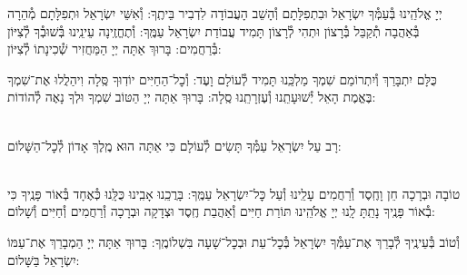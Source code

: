 \documentclass[twoside, openany, parskip=half, 11pt]{book}
\begin{document}
יְיָ אֱלֹהֵֽינוּ בְּ֯עַמְּ֯ךָ יִשְׂרָאֵל וּבִתְפִלָּתָם וְ֯הָשֵׁב הָעֲבוֹדָה לִדְבִיר בֵּיתֶֽךָ: וְ֯אִשֵּׁי יִשְׂרָאֵל וּתְפִלָּתָם מְ֯הֵרָה בְּ֯אַהֲבָה תְ֯קַבֵּל בְּ֯רָצוֹן וּתְהִי לְ֯רָצוֹן תָּמִיד עֲבוֹדַת יִשְׂרָאֵל עַמֶּֽךָ: וְ֯תֶחֱזֶֽינָה עֵינֵֽינוּ בְּ֯שׁוּבְ֯ךָ לְ֯צִיּוֹן בְּ֯רַחֲמִים: בָּרוּךְ אַתָּה יְיָ הַמַּחֲזִיר שְׁ֯כִינָתוֹ לְ֯צִיּוֹן:

\modim

כֻּלָּם יִתְבָּרַךְ וְ֯יִתְרוֹמַם שִׁמְךָ מַלְכֵּֽנוּ תָּמִיד לְ֯עוֹלָם וָעֶד: וְ֯כׇל־הַחַיִּים יוֹדֽוּךָ סֶּֽלָה וִיהַלֲלוּ אֶת־שִׁמְךָ בֶּאֱמֶת הָאֵל יְ֯שׁוּעָתֵֽנוּ וְ֯עֶזְרָתֵֽנוּ סֶֽלָה: בָּרוּךְ אַתָּה יְיָ הַטּוֹב שִׁמְךָ וּלְךָ נָאֶה לְ֯הוֹדוֹת:







\begin{paracol}{2}

\\
רָב עַל יִשְׂרָאֵל עַמְּ֯ךָ תָּשִׂים לְ֯עוֹלָם כִּי אַתָּה הוּא מֶֽלֶךְ אָדוֹן לְ֯כׇל־הַשָּׁלוֹם:

\switchcolumn


\begin{small}
\\
טוֹבָה וּבְרָכָה חֵן וָחֶֽסֶד וְ֯רַחֲמִים עָלֵֽינוּ וְ֯עַל כׇּל־יִשְׂרָאֵל עַמֶּֽךָ: בָּרֲכֵֽנוּ אָבִֽינוּ כֻּלָּֽנוּ כְּ֯אֶחָד בְּ֯אוֹר פָּנֶֽיךָ כִּי בְ֯אוֹר פָּנֶֽיךָ נָתַֽתָּ לָֽנוּ יְיָ אֱלֹהֵֽינוּ תּוֹרַת חַיִּים וְ֯אַהֲבַת חֶֽסֶד וּצְדָקָה וּבְרָכָה וְ֯רַחֲמִים וְ֯חַיִּים וְ֯שָׁלוֹם:

\end{small}


\end{paracol}
וְ֯טוֹב בְּ֯עֵינֶֽיךָ לְ֯בָרֵךְ אֶת־עַמְּ֯ךָ יִשְׂרָאֵל בְּ֯כׇל־עֵת וּבְכׇל־שָׁעָה בִּשְׁלוֹמֶֽךָ: בָּרוּךְ אַתָּה יְיָ הַמְבָרֵךְ אֶת־עַמּוֹ יִשְׂרָאֵל בַּשָּׁלוֹם:

\tachanunim


\vfill

\end{document}
